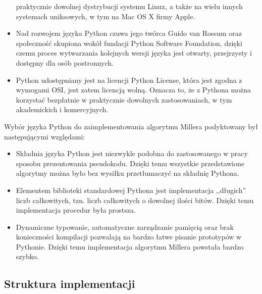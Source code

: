\begin{itemize}
praktycznie dowolnej dystrybucji systemu Linux,
a także na wielu innych systemach uniksowych,
w tym na Mac OS X firmy Apple.
\item
Nad rozwojem języka Python czuwa jego twórca Guido van Rossum
oraz społeczność skupiona wokół fundacji Python Software Foundation,
dzięki czemu proces wytwarzania kolejnych wersji języka
jest otwarty, przejrzysty i dostępny dla osób postronnych.
\item
Python udostępniany jest na licencji Python License,
która jest zgodna z wymogami OSI, jest zatem licencją wolną.
Oznacza to, że z Pythona można korzystać bezpłatnie
w praktycznie dowolnych zastosowaniach, w tym akademickich i komercyjnych.
\end{itemize}

Wybór języka Python do zaimplementowania algorytmu Millera
podyktowany był następującymi względami:
\begin{itemize}
\item
Składnia języka Python jest niezwykle podobna
do zastosowanego w pracy sposobu prezentowania pseudokodu.
Dzięki temu wszystkie przedstawione algorytmy
można było bez wysiłku przetłumaczyć
na składnię Pythona.
\item
Elementem biblioteki standardowej Pythona
jest implementacja ,,długich'' liczb całkowitych,
tzn. liczb całkowitych o dowolnej ilości bitów.
Dzięki temu implementacja procedur była prostsza.
\item
Dynamiczne typowanie, automatyczne zarządzanie pamięcią
oraz brak konieczności kompilacji
pozwalają na bardzo łatwe pisanie prototypów w Pythonie.
Dzięki temu implementacja algorytmu Millera powstała bardzo szybko.
\end{itemize}

\subsection*{Struktura implementacji}

